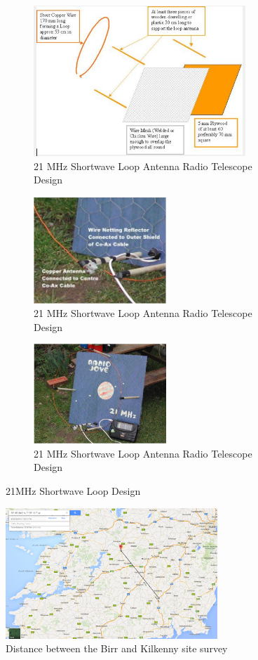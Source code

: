 \documentclass[runningheads,a4paper]{llncs}
\begin{document}
%
\begin{figure}	
	\centering
	\begin{subfigure}[t]{8cm}
		\centering
		\includegraphics[width=8cm]{images/14}
		\caption{21 MHz Shortwave Loop Antenna Radio Telescope Design \citep{greef-12}}\label{fig:loop_antenna_design_a}		
	\end{subfigure}
	\quad
	\begin{subfigure}[t]{5cm}
		\centering
		\includegraphics[width=5cm]{images/16}
		\caption{21 MHz Shortwave Loop Antenna Radio Telescope Design \citep{greef-12}}\label{fig:loop_antenna_design_b}
	\end{subfigure}
	\quad
	\begin{subfigure}[t]{5cm}
		\centering
		\includegraphics[width=5cm]{images/15}
		\caption{21 MHz Shortwave Loop Antenna Radio Telescope Design \citep{greef-12}}\label{fig:loop_antenna_design_c}
	\end{subfigure}
	\caption{21MHz Shortwave Loop Design}\label{fig:loop_antenna_design}
\end{figure}
%

%
\begin{figure}[here]
\centering
\includegraphics[width=8cm]{images/36}
\caption{Distance between the Birr and Kilkenny site survey}
\label{fig:site_survey_birr_kilkenny_distance}
\end{figure}
%
\end{document}
